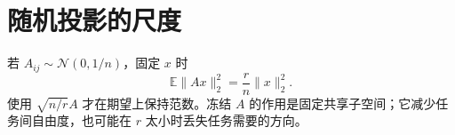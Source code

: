 \documentclass[11pt]{article}
\numberwithin{equation}{section}
\newcommand{\E}{\mathbb{E}}
\newcommand{\1}{\mathbf{1}}
\newcommand{\cN}{\mathcal{N}}
\begin{document}
\section{随机投影的尺度}
若 $A_{ij}\sim\cN(0,1/n)$，固定 $x$ 时
\begin{equation}
  \E\|Ax\|_2^2=\frac rn\|x\|_2^2.
\end{equation}
使用 $\sqrt{n/r}A$ 才在期望上保持范数。冻结 $A$ 的作用是固定共享子空间；它减少任务间自由度，也可能在 $r$ 太小时丢失任务需要的方向。
\end{document}
